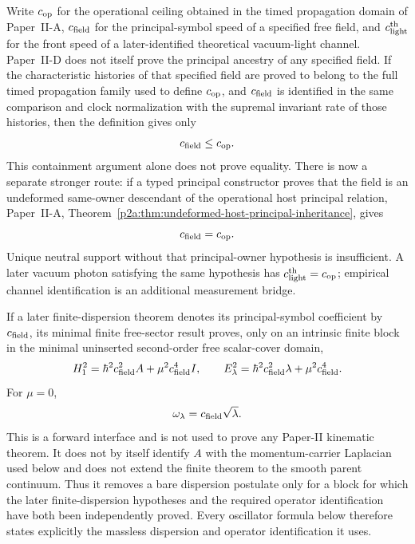 \documentclass[11pt,a4paper]{article}
\begin{document}
\begin{remark}
\label{p2d:rem:dispersion-speed-details}
Write \(c_{\rm op}\) for the operational ceiling obtained in the timed
propagation domain of Paper~II-A, \(c_{\rm field}\) for the principal-symbol
speed of a specified free field, and \(c_{\rm light}^{\rm th}\) for the front
speed of a later-identified theoretical vacuum-light channel.  Paper~II-D
does not itself prove the principal ancestry of any specified field.
If the characteristic histories of that specified field are proved to
belong to the full timed propagation family used to define \(c_{\rm op}\),
and \(c_{\rm field}\) is identified in the same comparison and clock
normalization with the supremal invariant rate of those histories, then the
definition gives only
\[
        c_{\rm field}\le c_{\rm op}.
\]
This containment argument alone does not prove equality.  There is now a
separate stronger route: if a typed principal constructor proves that the
field is an undeformed same-owner descendant of the operational host
principal relation, Paper~II-A,
Theorem~\ref{p2a:thm:undeformed-host-principal-inheritance}, gives
\[
        c_{\rm field}=c_{\rm op}.
\]
Unique neutral support without that principal-owner hypothesis is
insufficient.  A later vacuum photon satisfying the same hypothesis has
\(c_{\rm light}^{\rm th}=c_{\rm op}\); empirical channel identification is
an additional measurement bridge.

If a later finite-dispersion theorem denotes its principal-symbol coefficient
by \(c_{\rm field}\), its minimal finite free-sector result proves, only on
an intrinsic finite block
in the minimal uninserted second-order free scalar-cover domain,
\[
 H_1^2
 =
 \hbar^2c_{\rm field}^2A
 +\mu^2c_{\rm field}^4I,
 \qquad
 E_\lambda^2
 =
 \hbar^2c_{\rm field}^2\lambda
 +\mu^2c_{\rm field}^4.
\]
For \(\mu=0\),
\[
        \omega_\lambda=c_{\rm field}\sqrt{\lambda}.
\]
This is a forward interface and is not used to prove any Paper-II kinematic
theorem.  It does not by itself identify \(A\) with the momentum-carrier
Laplacian used below and does not extend the finite theorem to the smooth parent
continuum.  Thus it removes a bare dispersion postulate only for a block for
which the later finite-dispersion hypotheses and the required operator identification have
both been independently proved.  Every oscillator formula below therefore
states explicitly the massless dispersion and operator identification it uses.
\end{remark}
\end{document}
